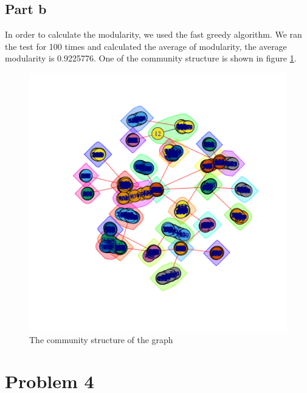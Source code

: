 \documentclass{article}
\begin{document}
\subsection{Part b}
In order to calculate the modularity, we used the fast greedy algorithm. We ran the test for 100 times and calculated the average of modularity, the average modularity is 0.9225776. One of the community structure is shown in figure \ref{fig:p3_2}.
\begin{figure}[htbp]
\centering
\includegraphics[width=.8\textwidth]{p3_2.png}
\caption{The community structure of the graph}
\label{fig:p3_2}
\end{figure}
\section{Problem 4}
\end{document}
